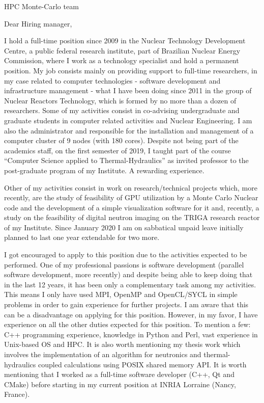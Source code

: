 \documentclass[11pt]{letter}
\begin{document}
\begin{letter}{HPC Monte-Carlo team}

  \opening{Dear Hiring manager,}
  
  I hold a full-time position since 2009 in the Nuclear Technology Development Centre, a public federal
  research institute, part of Brazilian Nuclear Energy Commission, where I work as a technology
  specialist and hold a permanent position. My job consists mainly on
  providing support to full-time researchers, in my case
  related to computer technologies - software development and infrastructure management - what I have been
  doing since 2011 in the group of Nuclear Reactors Technology, which is formed by no more than a dozen of researchers.
  Some of my activities consist in co-advising undergraduate and graduate students in computer related
  activities and Nuclear Engineering. I am also the administrator and responsible for the installation and management of a
  computer cluster of 9 nodes (with 180 cores). Despite not being part of the academics staff, on the first semester of 2019,
  I taught part of the course ``Computer Science applied to Thermal-Hydraulics'' as invited professor to the post-graduate 
  program of my Institute. A rewarding experience.

  Other of my activities consist in work on research/technical projects which, more recently, are the study of
  feasibility of GPU utilization by a Monte Carlo Nuclear code and the development of
  a simple visualization software for it and, recently, a study on the feasibility of digital neutron imaging on
  the TRIGA research reactor of my Institute. Since January 2020 I am on sabbatical unpaid leave initially planned to last one year extendable for two more.

  I got encouraged to apply to this position due to the activities expected to be performed. One of my professional
  passions is software development (parallel software development, more recently) and despite being able to keep doing that in the last 12 years, it has been only a complementary task among my activities. This means I only have used MPI, OpenMP and OpenCL/SYCL in simple problems in order to gain experience for further projects. I am aware that this can be a disadvantage on applying for this position. However, in my favor, I have experience on all the other duties expected for this position. To mention a few: C++ programming experience, knowledge in Python and Perl, vast experience in Unix-based OS and HPC. It is also worth mentioning my thesis work which involves the implementation of an algorithm for neutronics and thermal-hydraulics coupled calculations using POSIX shared memory API. It is worth mentioning that I worked as a full-time software developer (C++, Qt and CMake) before starting in my current position at INRIA Lorraine (Nancy, France).


\end{letter}
\end{document}
